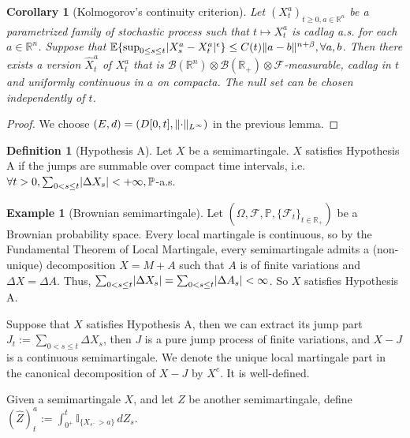 \documentclass[openany,oneside]{book}
\newtheorem{cor}[thm]{Corollary}
\theoremstyle{definition}
\newtheorem{defn}[thm]{Definition}
\newtheorem{eg}[thm]{Example}
\theoremstyle{remark}
\newcommand{\E}{\mathbb{E}} %
\renewcommand{\P}{\mathbb{P}} %
\newcommand{\I}{\mathbb{I}} %
\DeclarePairedDelimiter{\abs}{\lvert}{\rvert} %
\DeclarePairedDelimiter{\norm}{\lVert}{\rVert} %
\begin{document}
\begin{cor}[Kolmogorov's continuity criterion]
Let $(X^a_t)_{t\ge 0, a\in \mathbb{R}^n}$ be a parametrized family of stochastic process such that $t\mapsto X^a_t$ is cadlag a.s. for each $a\in \mathbb{R}^n$. Suppose that $\E\{\sup_{0\le s\le t}\abs{X^a_s - X^a_t}^\epsilon \} \le C(t) \norm{a-b}^{n+\beta}, \forall a,b$. Then there exists a version $\hat{X}^a_t$ of $X^a_t$ that is $\mathcal{B}(\mathbb{R}^n) \otimes \mathcal{B}(\mathbb{R}_+) \otimes \mathcal{F}$-measurable, cadlag in $t$ and uniformly continuous in $a$ on compacta. The null set can be chosen independently of $t$.
\end{cor}
\begin{proof}
We choose $(E,d) = (D[0,t],\norm{\cdot}_{L^\infty})$ in the previous lemma.
\end{proof}




\begin{defn}[Hypothesis A]
Let $X$ be a semimartingale. $X$ satisfies Hypothesis A if the jumps are summable over compact time intervals, i.e. $\forall t>0, \sum_{0<s\le t} \abs{\Delta X_s} < +\infty, \P$-a.s.
\end{defn}

\begin{eg}[Brownian semimartingale]
Let $(\Omega,\mathcal{F}, \P, \{\mathcal{F}_t\}_{t\in\mathbb{R}_+})$ be a Brownian probability space. Every local martingale is continuous, so by the Fundamental Theorem of Local Martingale, every semimartingale admits a (non-unique) decomposition $X=M+A$ such that $A$ is of finite variations and $\Delta X = \Delta A$. Thus, $\sum_{0<s\le t}\abs{\Delta X_s} = \sum_{0<s\le t}\abs{\Delta A_s} < \infty$. So $X$ satisfies Hypothesis A.
\end{eg}

Suppose that $X$ satisfies Hypothesis A, then we can extract its jump part $J_t := \sum_{0<s\le t}\Delta X_s$, then $J$ is a pure jump process of finite variations, and $X-J$ is a continuous semimartingale. We denote the unique local martingale part in the canonical decomposition of $X-J$ by $X^c$. It is well-defined.

Given a semimartingale $X$, and let $Z$ be another semimartingale, define $(\hat{Z})^a_t := \int_{0^+}^t \I_{\{X_{s^-}>a\}} \,d Z_s$.
\end{document}
